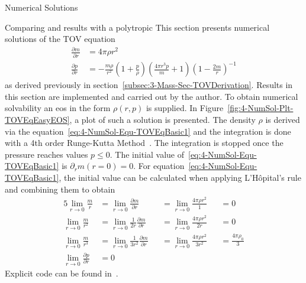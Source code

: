 \begin{section}{Numerical Solutions}
\begin{subsection}{Comparing \texorpdfstring{}{TOV} and \texorpdfstring{}{LE} results with a polytropic \texorpdfstring{}{EoS}}
\label{subsec:4-NumSol-Sec-Comp-TOV-LE}
This section presents numerical solutions of the \ac{TOV} equation
\begin{align}
	\frac{\partial m}{\partial r} &= 4\pi\rho r^2\label{eq:4-NumSol-Equ-TOVEqBasic1}\\
	\frac{\partial p}{\partial r} &=-\frac{m\rho}{r^2}\left(1+\frac{p}{\rho}\right)\left(\frac{4\pi r^3 p}{m}+1\right)\left(1-\frac{2m}{r}\right)^{-1}
	\label{eq:4-NumSol-Equ-TOVEqBasic2}
\end{align}
as derived previously in section~\ref{subsec:3-Mass-Sec-TOVDerivation}.
Results in this section are implemented and carried out by the author.
To obtain numerical solvability an \ac{eos} in the form $\rho(r,p)$ is supplied.
In Figure~\ref{fig:4-NumSol-Plt-TOVEqEasyEOS}, a plot of such a solution is presented.
The density $\rho$ is derived via the equation~\eqref{eq:4-NumSol-Equ-TOVEqBasic1} and the integration is done with a 4th order Runge-Kutta Method~\cite{rungeUeberNumerischeAufloesung1895, schlömilch1901zeitschrift, h.SimplifiedDerivationAnalysis2010}.
The integration is stopped once the pressure reaches values $p\leq0$.
The initial value of~\eqref{eq:4-NumSol-Equ-TOVEqBasic1} is $\partial_r m(r=0)=0$.
For equation~\eqref{eq:4-NumSol-Equ-TOVEqBasic1}, the initial value can be calculated when applying L'Hôpital's rule and combining them to obtain
\begin{alignat}{5}
	\lim\limits_{r\rightarrow0}\frac{m}{r} &= \lim\limits_{r\rightarrow0}\frac{\partial m}{\partial r} &&=\lim\limits_{r\rightarrow0}\frac{4\pi\rho r^2}{1} &&= 0\\
	\lim\limits_{r\rightarrow0}\frac{m}{r^2} &= \lim\limits_{r\rightarrow0}\frac{1}{2r}\frac{\partial m}{\partial r}  &&= \lim\limits_{r\rightarrow0}\frac{4\pi\rho r^2}{2r} &&= 0\\
	\lim\limits_{r\rightarrow0}\frac{m}{r^3} &= \lim\limits_{r\rightarrow0}\frac{1}{3r^2}\frac{\partial m}{\partial r} &&=\lim\limits_{r\rightarrow0}\frac{4\pi\rho r^2}{3r^2} &&= \frac{4\pi\rho_0}{3}\\
	\lim\limits_{r\rightarrow0}\frac{\partial p}{\partial r} &= 0
\end{alignat}
Explicit code can be found in~\cite{pleyerGithubRepositoryJonas2021}.

\end{subsection}
\end{section}
